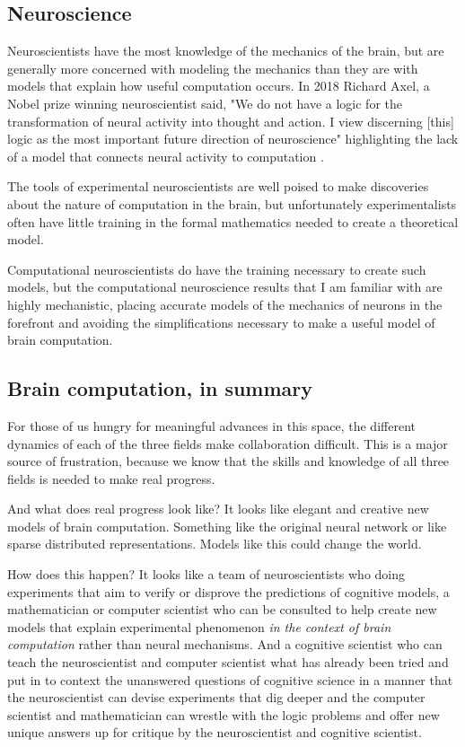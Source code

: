 \documentclass{article}
\begin{document}
\subsection*{Neuroscience}

Neuroscientists have the most knowledge of the mechanics of the brain, but are generally more concerned with modeling the mechanics than they are with models that explain how useful computation occurs. In 2018 Richard Axel, a Nobel prize winning neuroscientist said, "We do not have a logic for the transformation of neural activity into thought and action. I view discerning [this] logic as the most important future direction of neuroscience" highlighting the lack of a model that connects neural activity to computation \cite{Axel2018}.

The tools of experimental neuroscientists are well poised to make discoveries about the nature of computation in the brain, but unfortunately experimentalists often have little training in the formal mathematics needed to create a theoretical model.

Computational neuroscientists do have the training necessary to create such models, but the computational neuroscience results that I am familiar with are highly mechanistic, placing accurate models of the mechanics of neurons in the forefront and avoiding the simplifications necessary to make a useful model of brain computation.

\subsection*{Brain computation, in summary}

For those of us hungry for meaningful advances in this space, the different dynamics of each of the three fields make collaboration difficult. This is a major source of frustration, because we know that the skills and knowledge of all three fields is needed to make real progress.

And what does real progress look like? It looks like elegant and creative new models of brain computation. Something like the original neural network or like sparse distributed representations. Models like this could change the world.

How does this happen? It looks like a team of neuroscientists who doing experiments that aim to verify or disprove the predictions of cognitive models, a mathematician or computer scientist who can be consulted to help create new models that explain experimental phenomenon \textit{in the context of brain computation} rather than neural mechanisms. And a cognitive scientist who can teach the neuroscientist and computer scientist what has already been tried and put in to context the unanswered questions of cognitive science in a manner that the neuroscientist can devise experiments that dig deeper and the computer scientist and mathematician can wrestle with the logic problems and offer new unique answers up for critique by the neuroscientist and cognitive scientist.
\end{document}
